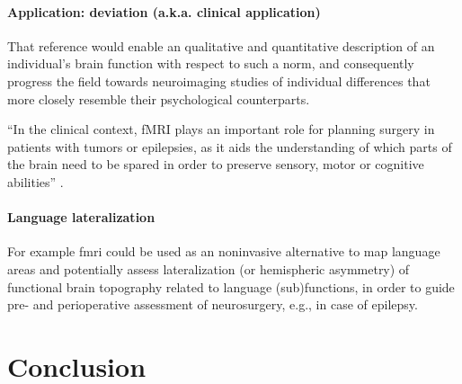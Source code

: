 \paragraph{Application: deviation (a.k.a. clinical application)}





%
That reference would enable an qualitative and quantitative description of an
individual's brain function with respect to such a norm, and consequently
progress the field towards neuroimaging studies of individual differences that
more closely resemble their psychological counterparts.


``In the clinical context, fMRI plays an important role for planning surgery in
patients with tumors or epilepsies, as it aids the understanding of which parts
of the brain need to be spared in order to preserve sensory, motor or cognitive
abilities'' \citep{wegrzyn2018thought}.


\paragraph{Language lateralization}



%
For example \ac{fmri} could be used as an noninvasive alternative to map
language areas and potentially assess lateralization (or hemispheric asymmetry)
of functional brain topography related to language (sub)functions, in order to
guide pre- and perioperative assessment of neurosurgery, e.g., in case of
epilepsy.



\section{Conclusion}

